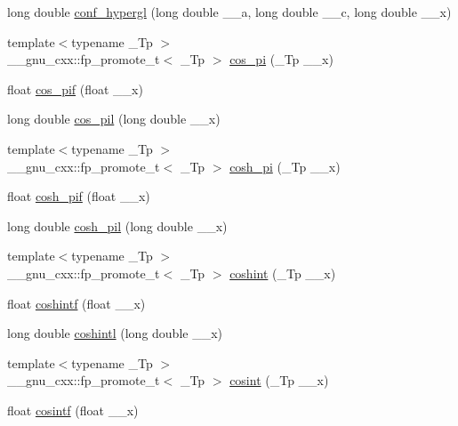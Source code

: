 \begin{DoxyCompactItemize}
\item 
long double \hyperlink{group__gnu__math__spec__func_ga0a9853f30d8fa515a12cd45a92da832e}{conf\+\_\+hypergl} (long double \+\_\+\+\_\+a, long double \+\_\+\+\_\+c, long double \+\_\+\+\_\+x)
\item 
{\footnotesize template$<$typename \+\_\+\+Tp $>$ }\\\+\_\+\+\_\+gnu\+\_\+cxx\+::fp\+\_\+promote\+\_\+t$<$ \+\_\+\+Tp $>$ \hyperlink{group__gnu__math__spec__func_gafc4698ae591b0e9e61285b0794d43ef4}{cos\+\_\+pi} (\+\_\+\+Tp \+\_\+\+\_\+x)
\item 
float \hyperlink{group__gnu__math__spec__func_gaddcae99c1572af6fa1d79b9cfa053033}{cos\+\_\+pif} (float \+\_\+\+\_\+x)
\item 
long double \hyperlink{group__gnu__math__spec__func_ga9b6816c0abf30fd88417d79a33cb5465}{cos\+\_\+pil} (long double \+\_\+\+\_\+x)
\item 
{\footnotesize template$<$typename \+\_\+\+Tp $>$ }\\\+\_\+\+\_\+gnu\+\_\+cxx\+::fp\+\_\+promote\+\_\+t$<$ \+\_\+\+Tp $>$ \hyperlink{group__gnu__math__spec__func_gaf59c68a01adfdab0f22c4fb405ab2a36}{cosh\+\_\+pi} (\+\_\+\+Tp \+\_\+\+\_\+x)
\item 
float \hyperlink{group__gnu__math__spec__func_ga79a2f5c9da96b5ea6c663d6efca24944}{cosh\+\_\+pif} (float \+\_\+\+\_\+x)
\item 
long double \hyperlink{group__gnu__math__spec__func_gab7bf4f591dd35af2bdb88a8219f5e248}{cosh\+\_\+pil} (long double \+\_\+\+\_\+x)
\item 
{\footnotesize template$<$typename \+\_\+\+Tp $>$ }\\\+\_\+\+\_\+gnu\+\_\+cxx\+::fp\+\_\+promote\+\_\+t$<$ \+\_\+\+Tp $>$ \hyperlink{group__gnu__math__spec__func_ga2411d513d418180285ace6650c7b7e31}{coshint} (\+\_\+\+Tp \+\_\+\+\_\+x)
\item 
float \hyperlink{group__gnu__math__spec__func_ga1af4d48209169967a836bd97e625a128}{coshintf} (float \+\_\+\+\_\+x)
\item 
long double \hyperlink{group__gnu__math__spec__func_ga6d24ab53fad13d421f07d9a9a509de14}{coshintl} (long double \+\_\+\+\_\+x)
\item 
{\footnotesize template$<$typename \+\_\+\+Tp $>$ }\\\+\_\+\+\_\+gnu\+\_\+cxx\+::fp\+\_\+promote\+\_\+t$<$ \+\_\+\+Tp $>$ \hyperlink{group__gnu__math__spec__func_gafd398869cde057087e6b3428a1d13a93}{cosint} (\+\_\+\+Tp \+\_\+\+\_\+x)
\item 
float \hyperlink{group__gnu__math__spec__func_ga87202351dc97d2c69e42bf58f911fb5a}{cosintf} (float \+\_\+\+\_\+x)

\end{DoxyCompactItemize}
